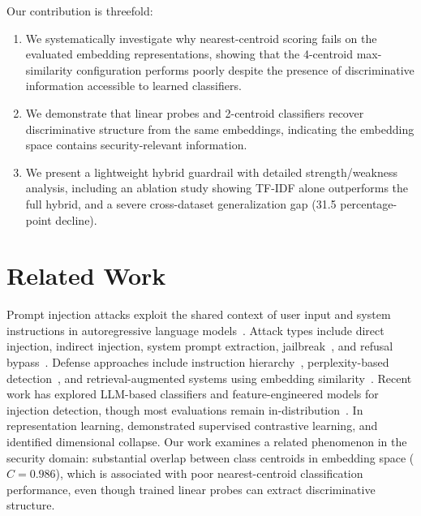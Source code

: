 \documentclass[12pt,a4paper]{article}
\begin{document}
Our contribution is threefold:
\begin{enumerate}[leftmargin=*]
    \item We systematically investigate why nearest-centroid scoring fails on the evaluated embedding representations, showing that the 4-centroid max-similarity configuration performs poorly despite the presence of discriminative information accessible to learned classifiers.
    \item We demonstrate that linear probes and 2-centroid classifiers recover discriminative structure from the same embeddings, indicating the embedding space contains security-relevant information.
    \item We present a lightweight hybrid guardrail with detailed strength/weakness analysis, including an ablation study showing TF-IDF alone outperforms the full hybrid, and a severe cross-dataset generalization gap (31.5 percentage-point decline).
\end{enumerate}

\section{Related Work}\label{sec:related}

Prompt injection attacks exploit the shared context of user input and system instructions in autoregressive language models~\citep{schulhoff2023hackaprompt, greshake2023not, liu2023prompt}. Attack types include direct injection, indirect injection, system prompt extraction, jailbreak~\citep{perez2023jailbreak, wei2023jailbroken}, and refusal bypass~\citep{li2024chatgpt}. Defense approaches include instruction hierarchy~\citep{wallace2024instruction}, perplexity-based detection~\citep{alon2023detecting}, and retrieval-augmented systems using embedding similarity~\citep{reimers2019sentence, xiao2023bge}. Recent work has explored LLM-based classifiers and feature-engineered models for injection detection, though most evaluations remain in-distribution~\citep{liu2023prompt}. In representation learning, \citet{khosla2020supervised} demonstrated supervised contrastive learning, and \citet{jing2022dimensional} identified dimensional collapse. Our work examines a related phenomenon in the security domain: substantial overlap between class centroids in embedding space ($C = 0.986$), which is associated with poor nearest-centroid classification performance, even though trained linear probes can extract discriminative structure.
\end{document}
